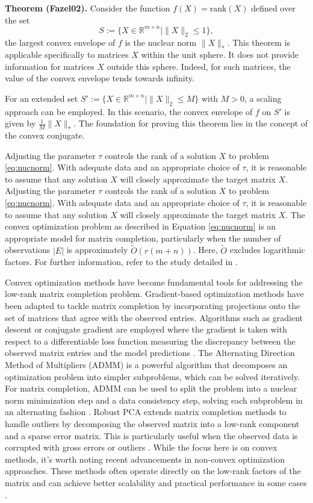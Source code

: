 \documentclass[10pt, twocolumn, reqno, a4paper,oneside]{amsart}
\numberwithin{equation}{section}
\numberwithin{theorem}{section}
\numberwithin{figure}{section}
\numberwithin{table}{section}
\numberwithin{theorem}{section}
\numberwithin{equation}{section}
\begin{document}
\textbf{Theorem (Fazel02)\cite{Fazel2002MatrixRank}.} Consider the function \( f(X)=\text{rank}(X) \) defined over the set
\[ S := \{X \in \mathbb{R}^{m \times n} \mid \|X\|_2 \leq 1\}, \]
the largest convex envelope of \( f \) is the nuclear norm \( \|X\|_* \). This theorem is applicable specifically to matrices \( X \) within the unit sphere. It does not provide information for matrices \( X \) outside this sphere. Indeed, for such matrices, the value of the convex envelope tends towards infinity.

For an extended set \( S' := \{X \in \mathbb{R}^{m \times n} \mid \|X\|_2 \leq M \} \) with \( M > 0 \), a scaling approach can be employed. In this scenario, the convex envelope of \( f \) on \( S' \) is given by \( \frac{1}{M} \|X\|_* \). The foundation for proving this theorem lies in the concept of the convex conjugate.

Adjusting the parameter $\tau$ controls the rank of a solution $X$ to problem \eqref{eq:nucnorm}. With adequate data and an appropriate choice of $\tau$, it is reasonable to assume that any solution $X$ will closely approximate the target matrix $X$. Adjusting the parameter $\tau$ controls the rank of a solution $X$ to problem \eqref{eq:nucnorm}. With adequate data and an appropriate choice of $\tau$, it is reasonable to assume that any solution $X$ will closely approximate the target matrix $X$. The convex optimization problem as described in Equation \eqref{eq:nucnorm} is an appropriate model for matrix completion, particularly when the number of observations $|E|$ is approximately $\tilde{O}(r(m+n))$. Here, $\tilde{O}$ excludes logarithmic factors. For further information, refer to the study detailed in \cite{NIPS2004_e0688d13}.


Convex optimization methods have become fundamental tools for addressing the low-rank matrix completion problem. Gradient-based optimization methods have been adapted to tackle matrix completion by incorporating projections onto the set of matrices that agree with the observed entries. Algorithms such as gradient descent or conjugate gradient are employed where the gradient is taken with respect to a differentiable loss function measuring the discrepancy between the observed matrix entries and the model predictions \cite{Toh2009AnAP}.
The Alternating Direction Method of Multipliers (ADMM) is a powerful algorithm that decomposes an optimization problem into simpler subproblems, which can be solved iteratively. For matrix completion, ADMM can be used to split the problem into a nuclear norm minimization step and a data consistency step, solving each subproblem in an alternating fashion \cite{TaleghaniSalahi2019}. Robust PCA extends matrix completion methods to handle outliers by decomposing the observed matrix into a low-rank component and a sparse error matrix. This is particularly useful when the observed data is corrupted with gross errors or outliers \cite{NIPS2009_c45147de}. While the focus here is on convex methods, it's worth noting recent advancements in non-convex optimization approaches. These methods often operate directly on the low-rank factors of the matrix and can achieve better scalability and practical performance in some cases \cite{7536166}.
\end{document}

